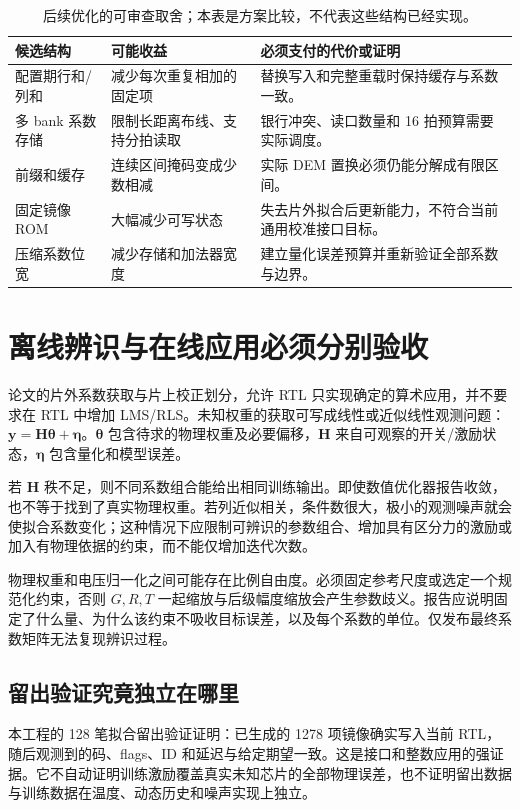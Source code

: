 \begin{table}[htbp]\centering\small
\begin{tabularx}{\textwidth}{p{31mm}X X}\toprule
候选结构&可能收益&必须支付的代价或证明\\\midrule
配置期行和/列和&减少每次重复相加的固定项&替换写入和完整重载时保持缓存与系数一致。\\
多 bank 系数存储&限制长距离布线、支持分拍读取&银行冲突、读口数量和 16 拍预算需要实际调度。\\
前缀和缓存&连续区间掩码变成少数相减&实际 DEM 置换必须仍能分解成有限区间。\\
固定镜像 ROM&大幅减少可写状态&失去片外拟合后更新能力，不符合当前通用校准接口目标。\\
压缩系数位宽&减少存储和加法器宽度&建立量化误差预算并重新验证全部系数与边界。\\
\bottomrule\end{tabularx}
\caption{后续优化的可审查取舍；本表是方案比较，不代表这些结构已经实现。}
\end{table}

\section{离线辨识与在线应用必须分别验收}
论文的片外系数获取与片上校正划分，允许 RTL 只实现确定的算术应用，并不要求在 RTL 中增加 LMS/RLS。未知权重的获取可写成线性或近似线性观测问题：\(\mathbf y=\mathbf H\boldsymbol\theta+\boldsymbol\eta\)。\(\boldsymbol\theta\) 包含待求的物理权重及必要偏移，\(\mathbf H\) 来自可观察的开关/激励状态，\(\boldsymbol\eta\) 包含量化和模型误差。

若 \(\mathbf H\) 秩不足，则不同系数组合能给出相同训练输出。即使数值优化器报告收敛，也不等于找到了真实物理权重。若列近似相关，条件数很大，极小的观测噪声就会使拟合系数变化；这种情况下应限制可辨识的参数组合、增加具有区分力的激励或加入有物理依据的约束，而不能仅增加迭代次数。

物理权重和电压归一化之间可能存在比例自由度。必须固定参考尺度或选定一个规范化约束，否则 \(G,R,T\) 一起缩放与后级幅度缩放会产生参数歧义。报告应说明固定了什么量、为什么该约束不吸收目标误差，以及每个系数的单位。仅发布最终系数矩阵无法复现辨识过程。

\subsection{留出验证究竟独立在哪里}
本工程的 128 笔拟合留出验证证明：已生成的 1278 项镜像确实写入当前 RTL，随后观测到的码、flags、ID 和延迟与给定期望一致。这是接口和整数应用的强证据。它不自动证明训练激励覆盖真实未知芯片的全部物理误差，也不证明留出数据与训练数据在温度、动态历史和噪声实现上独立。

